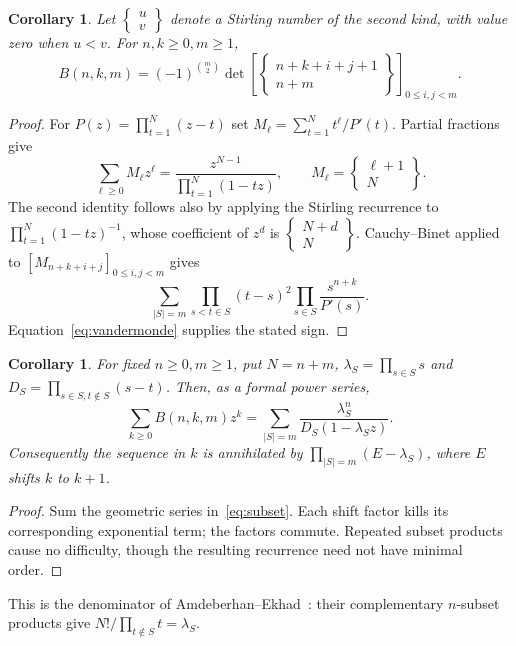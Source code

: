 \documentclass[11pt]{article}
\newtheorem{corollary}[theorem]{Corollary}
\begin{document}
\begin{corollary}\label{cor:moment}
Let $\left\{\begin{smallmatrix}u\\v\end{smallmatrix}\right\}$ denote a Stirling
number of the second kind, with value zero when $u<v$. For $n,k\geq0,m\geq1$,
\[
B(n,k,m)=(-1)^{\binom m2}
\det\left[\left\{\begin{matrix}n+k+i+j+1\\n+m\end{matrix}\right\}\right]_{0\leq i,j<m}.
\]
\end{corollary}
\begin{proof}
For $P(z)=\prod_{t=1}^N(z-t)$ set $M_\ell=\sum_{t=1}^N t^\ell/P'(t)$.
Partial fractions give
\[
\sum_{\ell\geq0}M_\ell z^\ell
=\frac{z^{N-1}}{\prod_{t=1}^N(1-tz)},\qquad
M_\ell=\left\{\begin{matrix}\ell+1\\N\end{matrix}\right\}.
\]
The second identity follows also by applying the Stirling recurrence to
$\prod_{t=1}^N(1-tz)^{-1}$, whose coefficient of $z^d$ is
$\left\{\begin{smallmatrix}N+d\\N\end{smallmatrix}\right\}$.
Cauchy--Binet applied to $[M_{n+k+i+j}]_{0\leq i,j<m}$ gives
\[
\sum_{|S|=m}\prod_{s<t\in S}(t-s)^2\prod_{s\in S}\frac{s^{n+k}}{P'(s)}.
\]
Equation~\eqref{eq:vandermonde} supplies the stated sign.
\end{proof}

\begin{corollary}\label{cor:rows}
For fixed $n\geq0,m\geq1$, put $N=n+m$, $\lambda_S=\prod_{s\in S}s$ and
$D_S=\prod_{s\in S,t\notin S}(s-t)$. Then, as a formal power series,
\[
\sum_{k\geq0}B(n,k,m)z^k
 =\sum_{|S|=m}\frac{\lambda_S^n}{D_S(1-\lambda_S z)}.
\]
Consequently the sequence in $k$ is annihilated by
$\prod_{|S|=m}(E-\lambda_S)$, where $E$ shifts $k$ to $k+1$.
\end{corollary}
\begin{proof}
Sum the geometric series in~\eqref{eq:subset}.
Each shift factor kills its corresponding exponential term; the factors commute.
Repeated subset products cause no difficulty, though the resulting recurrence
need not have minimal order.
\end{proof}
This is the denominator of Amdeberhan--Ekhad~\cite[Theorem 1]{ae}:
their complementary $n$-subset products give $N!/\prod_{t\notin S}t=\lambda_S$.
\end{document}
